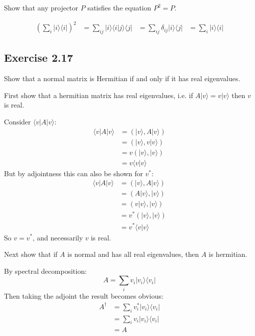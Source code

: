 \documentclass[]{article}
\newcommand{\bra}[1]{\langle #1 |}
\newcommand{\ket}[1]{| #1 \rangle}
\newcommand{\braket}[2]{\langle #1 | #2 \rangle}
\begin{document}
Show that any projector $P$ satisfies the equation $P^2 = P$.

\begin{align*}
	(\sum_i \ket{i}\bra{i})^2
	&= \sum_{ij} \ket{i}\braket{i}{j}\bra{j}
	&= \sum_{ij} \delta_{ij}\ket{i}\bra{j}
	&= \sum_i \ket{i}\bra{i}
\end{align*}

\subsection{Exercise 2.17}
Show that a normal matrix is Hermitian if and only if it has real eigenvalues.

First show that a hermitian matrix has real eigenvalues, i.e. if
$A\ket{v} = v\ket{v}$ then $v$ is real.

Consider $\bra{v}A\ket{v}$:
\begin{align*}
	\bra{v}A\ket{v}
	&= (\ket{v}, A\ket{v}) \\
	&= (\ket{v}, v\ket{v}) \\
	&= v(\ket{v}, \ket{v}) \\
&= v\braket{v}{v}
\end{align*}
But by adjointness this can also be shown for $v^*$:
\begin{align*}
	\bra{v}A\ket{v}
	&= (\ket{v}, A\ket{v}) \\
	&= (A\ket{v}, \ket{v}) \\
	&= (v\ket{v}, \ket{v}) \\
	&= v^*(\ket{v}, \ket{v}) \\
&= v^*\braket{v}{v}
\end{align*}
So $v = v^*$, and necessarily $v$ is real.

Next show that if $A$ is normal and has all real eigenvalues, then $A$ is hermitian.

By spectral decomposition:
\[A = \sum_i v_i\ket{v_i}\bra{v_i}\]
Then taking the adjoint the result becomes obvious:
\begin{align*}
A^\dagger
	&= \sum_i v_i^* \ket{v_i}\bra{v_i} \\
	&= \sum_i v_i \ket{v_i}\bra{v_i} \\
&= A
\end{align*}
\end{document}
